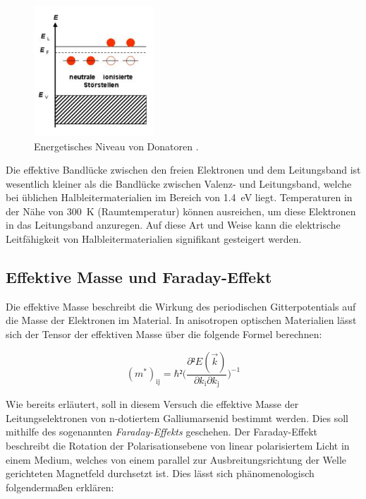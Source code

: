 \begin{figure}[H]
    \centering
    \includegraphics[width=0.4\textwidth]{content/nDot.png}
    \caption{Energetisches Niveau von Donatoren \cite{nDotierung}.}
    \label{fig:nDot}
\end{figure}

\noindent Die effektive Bandlücke zwischen den freien Elektronen und dem Leitungsband ist wesentlich kleiner als die Bandlücke 
zwischen Valenz- und Leitungsband, welche bei üblichen Halbleitermaterialien im Bereich von \qty{1.4}{\electronvolt} liegt. Temperaturen 
in der Nähe von \qty{300}{\kelvin} (Raumtemperatur) können ausreichen, um diese Elektronen in das Leitungsband anzuregen. 
Auf diese Art und Weise kann die elektrische Leitfähigkeit von Halbleitermaterialien signifikant gesteigert werden. 

\subsection{Effektive Masse und Faraday-Effekt}

\noindent Die effektive Masse beschreibt die Wirkung des periodischen Gitterpotentials auf die Masse der Elektronen im Material.
In anisotropen optischen Materialien lässt sich der Tensor der effektiven Masse über die folgende Formel berechnen:

\begin{equation}
    (m^{\ast})_{\text{ij}} = \hbar²\biggl(\frac{\partial²E(\vec{k})}{\partial{}k_{\text{i}}\partial{}k_{\text{j}}}\biggr)^{-1}
    \label{eqn:meff}
\end{equation}

\noindent Wie bereits erläutert, soll in diesem Versuch die effektive Masse der Leitungselektronen von n-dotiertem Galliumarsenid bestimmt 
werden. Dies soll mithilfe des sogenannten \textit{Faraday-Effekts} geschehen. Der Faraday-Effekt beschreibt die Rotation der 
Polarisationsebene von linear polarisiertem Licht in einem Medium, welches von einem parallel zur Ausbreitungsrichtung der Welle gerichteten 
Magnetfeld durchsetzt ist. Dies lässt sich phänomenologisch folgendermaßen erklären: \\

